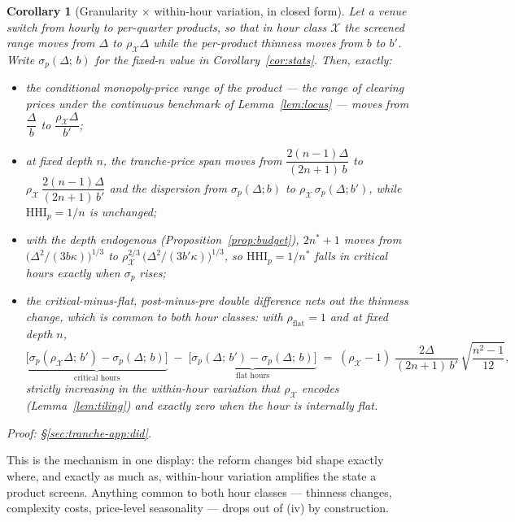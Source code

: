 \documentclass[11pt,a4paper]{article}
\newtheorem{corollary}{Corollary}
\theoremstyle{definition}
\theoremstyle{remark}
\theoremstyle{plain}
\begin{document}
\begin{corollary}[Granularity $\times$ within-hour variation, in closed form]\label{cor:did}
Let a venue switch from hourly to per-quarter products, so that in hour class $\mathcal X$ the screened range moves from $\Delta$ to $\rho_{\mathcal X}\Delta$ while the per-product thinness moves from $b$ to $b'$. Write $\sigma_p(\Delta;\, b)$ for the fixed-$n$ value in Corollary~\ref{cor:stats}. Then, exactly:
\begin{itemize}\setlength{\itemsep}{2pt}
\item[(i)] the conditional monopoly-price range of the product --- the range of clearing prices under the continuous benchmark of Lemma~\ref{lem:locus} --- moves from $\dfrac{\Delta}{b}$ to $\dfrac{\rho_{\mathcal X}\Delta}{b'}$;
\item[(ii)] at fixed depth $n$, the tranche-price span moves from $\dfrac{2(n-1)\Delta}{(2n+1)\,b}$ to $\rho_{\mathcal X}\,\dfrac{2(n-1)\Delta}{(2n+1)\,b'}$ and the dispersion from $\sigma_p(\Delta; b)$ to $\rho_{\mathcal X}\,\sigma_p(\Delta; b')$, while $\text{HHI}_p = 1/n$ is unchanged;
\item[(iii)] with the depth endogenous (Proposition~\ref{prop:budget}), $2n^*+1$ moves from $\bigl(\Delta^2/(3 b \kappa)\bigr)^{1/3}$ to $\rho_{\mathcal X}^{2/3}\,\bigl(\Delta^2/(3 b' \kappa)\bigr)^{1/3}$, so $\text{HHI}_p = 1/n^*$ falls in critical hours exactly when $\sigma_p$ rises;
\item[(iv)] the critical-minus-flat, post-minus-pre double difference nets out the thinness change, which is common to both hour classes: with $\rho_{\text{flat}} = 1$ and at fixed depth $n$,
\[
\underbrace{\bigl[\sigma_p(\rho_{\mathcal X}\Delta;\, b') - \sigma_p(\Delta;\, b)\bigr]}_{\text{critical hours}}
\;-\;
\underbrace{\bigl[\sigma_p(\Delta;\, b') - \sigma_p(\Delta;\, b)\bigr]}_{\text{flat hours}}
\;=\;
(\rho_{\mathcal X} - 1)\;\frac{2\Delta}{(2n+1)\,b'}\,\sqrt{\frac{n^2-1}{12}},
\]
strictly increasing in the within-hour variation that $\rho_{\mathcal X}$ encodes (Lemma~\ref{lem:tiling}) and exactly zero when the hour is internally flat.
\end{itemize}
\emph{Proof: \S\ref{sec:tranche-app:did}.}
\end{corollary}

This is the mechanism in one display: the reform changes bid shape exactly where, and exactly as much as, within-hour variation amplifies the state a product screens. Anything common to both hour classes --- thinness changes, complexity costs, price-level seasonality --- drops out of (iv) by construction.
\end{document}
